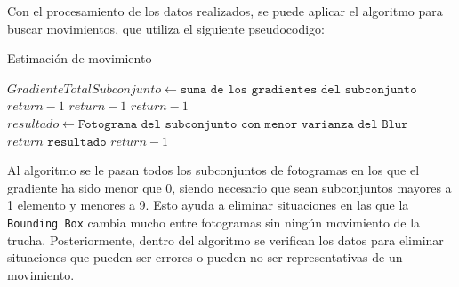 Con el procesamiento de los datos realizados, se puede aplicar el algoritmo para buscar movimientos, que utiliza el siguiente pseudocodigo:
\begin{algorithm}
    \caption{Estimación de movimiento}
\begin{algorithmic}[1]
    \State $GradienteTotalSubconjunto \gets \texttt{suma de los gradientes del subconjunto}$
        \State $return -1$
        \State $return -1$
            \State $return -1$
        \Else{$ $}
            \State $resultado \gets \texttt{Fotograma del subconjunto con menor varianza del Blur}$
            \State $return \texttt{  resultado}$
            \EndIf
    \Else{$ $}
        \State $return -1$
    \EndIf
\end{algorithmic}
\end{algorithm}\newline
Al algoritmo se le pasan todos los subconjuntos de fotogramas en los que el gradiente ha sido menor que 0, siendo necesario que sean subconjuntos mayores a 1 elemento y menores a 9. Esto ayuda a eliminar 
situaciones en las que la \texttt{Bounding Box} cambia mucho entre fotogramas sin ningún movimiento de la trucha. Posteriormente, dentro del algoritmo se verifican los datos para eliminar situaciones 
que pueden ser errores o pueden no ser representativas de un movimiento.

\clearpage
